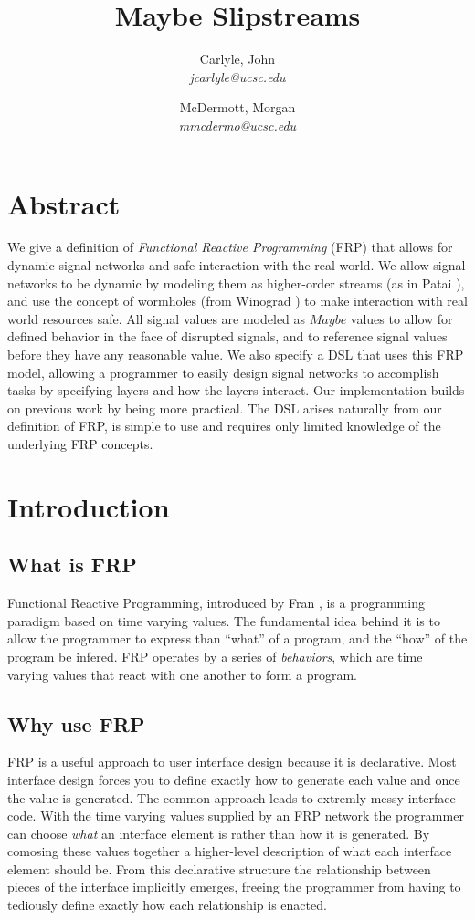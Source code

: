 \documentclass[twocolumn,11pt,english]{article}
\title{Maybe Slipstreams}
\date{}
\author{
  Carlyle, John\\
  \textit{jcarlyle@ucsc.edu}
  \and
  McDermott, Morgan\\
  \textit{mmcdermo@ucsc.edu}
}
\begin{document}
\maketitle

\section{Abstract}
We give a definition of \textit{Functional Reactive Programming} (FRP) that allows for dynamic signal networks and safe interaction with the real world. We allow signal networks to be dynamic by modeling them as higher-order streams (as in Patai \cite{HighOrderStreams}), and use the concept of wormholes (from Winograd \cite{WinogradCort2012HS}) to make interaction with real world resources safe. All signal values are modeled as $Maybe$ values to allow for defined behavior in the face of disrupted signals, and to reference signal values before they have any reasonable value. We also specify a DSL that uses this FRP model, allowing a programmer to easily design signal networks to accomplish tasks by specifying layers and how the layers interact. Our implementation builds on previous work by being more practical. The DSL arises naturally from our definition of FRP, is simple to use and requires only limited knowledge of the underlying FRP concepts.

\section{Introduction}
  
\subsection{What is FRP}
Functional Reactive Programming, introduced by Fran \cite{ElliottHudak97:Fran}, is a programming paradigm based on time varying values. The fundamental idea behind it is to allow the programmer to express than ``what'' of a program, and the ``how'' of the program be infered. FRP operates by a series of \textit{behaviors}, which are time varying values that react with one another to form a program. 

\subsection{Why use FRP}
FRP is a useful approach to user interface design because it is declarative. Most interface design forces you to define exactly how to generate each value and once the value is generated. The common approach leads to extremly messy interface code. With the time varying values supplied by an FRP network the programmer can choose \textit{what} an interface element is rather than how it is generated. By comosing these values together a higher-level description of what each interface element should be. From this declarative structure the relationship between pieces of the interface implicitly emerges, freeing the programmer from having to tediously define exactly how each relationship is enacted.
\end{document}
